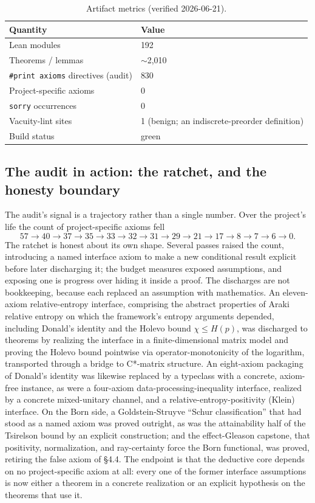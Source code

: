 \documentclass[11pt]{article}
\begin{document}
\begin{table}[ht]
\centering
\caption{Artifact metrics (verified 2026-06-21).}
\label{tab:metrics}
\begin{tabular}{@{}ll@{}}
\toprule
Quantity & Value \\
\midrule
Lean modules & 192 \\
Theorems / lemmas & $\sim$2{,}010 \\
\texttt{\#print axioms} directives (audit) & 830 \\
Project-specific axioms & 0 \\
\texttt{sorry} occurrences & 0 \\
Vacuity-lint sites & 1 (benign; an indiscrete-preorder definition) \\
Build status & green \\
\bottomrule
\end{tabular}
\end{table}

\subsection{The audit in action: the ratchet, and the honesty boundary}

The audit's signal is a trajectory rather than a single number. Over the project's life the count of
project-specific axioms fell
\[
 57 \to 40 \to 37 \to 35 \to 33 \to 32 \to 31 \to 29 \to 21 \to 17 \to 8 \to 7 \to 6 \to 0.
\]
The ratchet is honest about its own shape. Several passes raised the count, introducing a named
interface axiom to make a new conditional result explicit before later discharging it; the budget
measures exposed assumptions, and exposing one is progress over hiding it inside a proof. The
discharges are not bookkeeping, because each replaced an assumption with mathematics. An eleven-axiom
relative-entropy interface, comprising the abstract properties of Araki relative entropy on which the
framework's entropy arguments depended, including Donald's identity and the Holevo bound
$\chi \le H(p)$, was discharged to theorems by realizing the interface in a finite-dimensional matrix
model and proving the Holevo bound pointwise via operator-monotonicity of the logarithm, transported
through a bridge to C*-matrix structure. An eight-axiom packaging of Donald's identity was likewise
replaced by a typeclass with a concrete, axiom-free instance, as were a four-axiom
data-processing-inequality interface, realized by a concrete mixed-unitary channel, and a
relative-entropy-positivity (Klein) interface. On the Born side, a Goldstein-Struyve ``Schur
classification'' that had stood as a named axiom was proved outright, as was the attainability half of
the Tsirelson bound by an explicit construction; and the effect-Gleason capstone, that positivity,
normalization, and ray-certainty force the Born functional, was proved, retiring the false axiom of
\S4.4. The endpoint is that the deductive core depends on no project-specific axiom at all: every one
of the former interface assumptions is now either a theorem in a concrete realization or an explicit
hypothesis on the theorems that use it.
\end{document}
